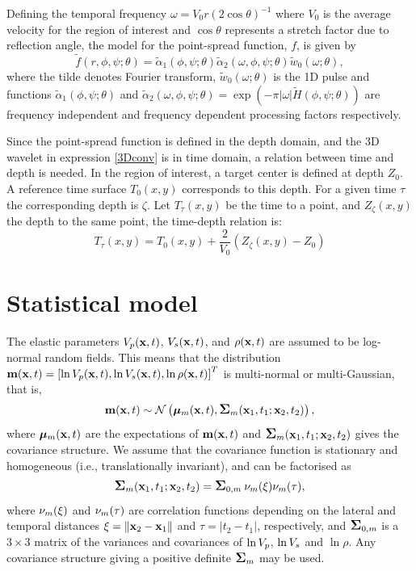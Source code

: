 Defining the temporal frequency $\omega = V_0r(2\cos{\theta})^{-1}$
where $V_0$ is the average velocity for the region of interest and
$\cos{\theta}$ represents a stretch factor due to reflection angle,
the model for the point-spread function, $f$, is given by
\begin{equation}
  \tilde{f}(r,\phi,\psi;\theta) 
  = \tilde{\alpha}_1(\phi,\psi;\theta)
    \tilde{\alpha}_2(\omega,\phi,\psi;\theta)
    \tilde{w}_0\left(\omega;\theta\right), \label{eq:waveletform}
\end{equation}
where the tilde denotes Fourier transform,
$\tilde{w}_0(\omega;\theta)$ is the 1D pulse and functions
$\tilde{\alpha}_1(\phi,\psi;\theta)$ and
$\tilde{\alpha}_2(\omega,\phi,\psi;\theta) = \exp(-\pi |\omega|
\tilde{H}(\phi,\psi;\theta))$ are frequency independent and frequency
dependent processing factors respectively.

Since the point-spread function is defined in the depth domain, and the 3D wavelet in expression \eqref{3Dconv} is in time domain, a relation between time and depth is needed. In the region of interest, a target center is defined at depth $Z_0$. A reference time surface $T_0(x,y)$ corresponds to this depth. For a given time $\tau$ the corresponding depth is $\zeta$. Let $T_{\tau}(x,y)$ be the time to a point, and $Z_{\zeta}(x,y)$ the depth to the same point, the time-depth relation is:
\begin{equation}
T_{\tau}(x,y) = T_0(x,y) + \frac{2}{V_0}(Z_{\zeta}(x,y)-Z_0)
\end{equation}



\section{Statistical model}
\label{sec:statmodthe}
The elastic parameters $V_p(\mathbf{x},t)$, $V_s(\mathbf{x},t)$, and
$\rho(\mathbf{x},t)$ are assumed to be log-normal random
fields. This means that the distribution $\mathbf{m}(\mathbf{x},t) =
\left[\ln V_p(\mathbf{x},t),\ln V_s(\mathbf{x},t),\ln\rho(\mathbf{x},t)\right]^T$
is multi-normal or multi-Gaussian, that is,
%
\begin{equation}
  \mathbf{m}(\mathbf{x},t) \sim
  \mathcal{N}\left(\bm\mu_m(\mathbf{x},t),\mbox{\large\ensuremath{\boldsymbol{\Sigma}}}_m(\mathbf{x}_1,t_1;\mathbf{x}_2,t_2)\right),
\label{mdist}
\end{equation}
%
where $\bm\mu_m(\mathbf{x},t)$ are the expectations of
$\mathbf{m}(\mathbf{x},t)$ and $\mbox{\large\ensuremath{\boldsymbol{\Sigma}}}_m(\mathbf{x}_1,t_1;\mathbf{x}_2,t_2)$
gives the covariance structure. We assume that the covariance function
is stationary and homogeneous (i.e., translationally invariant), and
can be factorised as
%
\begin{equation}
  \mbox{\large\ensuremath{\boldsymbol{\Sigma}}}_m(\mathbf{x}_1,t_1;\mathbf{x}_2,t_2)
    = \mbox{\large\ensuremath{\boldsymbol{\Sigma}}}_{0,m} \: \nu_m(\xi) \nu_m(\tau), \label{sigma_m}
\end{equation}
%
where $\nu_m(\xi)$ and $\nu_m(\tau)$ are correlation functions
depending on the lateral and temporal distances
$\xi = \|\mathbf{x}_2 - \mathbf{x}_1\|$ and $\tau=|t_2-t_1|$,
respectively, and $\mbox{\large\ensuremath{\boldsymbol{\Sigma}}}_{0,m}$ is a $3\times 3$ matrix of the
variances and covariances of $\ln V_p$, $\ln V_s$ and $\ln\rho$. Any
covariance structure giving a positive definite $\mbox{\large\ensuremath{\boldsymbol{\Sigma}}}_m$ may be
used. 

